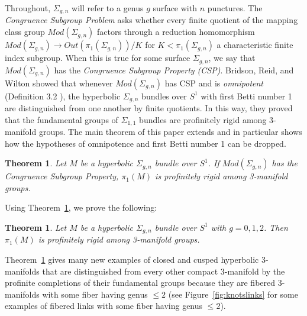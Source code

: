 \documentclass[12pt, reqno,oneside]{amsart}
\newtheorem{theorem}[lemma]{Theorem}
\theoremstyle{definition}
\theoremstyle{plain}
\theoremstyle{TheoremNum}
\numberwithin{equation}{section}
\numberwithin{table}{section}
\begin{document}
\medbreak Throughout, $\Sigma_{g,n}$ will refer to a genus $g$ surface with $n$ punctures. The {\it Congruence Subgroup Problem} asks whether every finite quotient of the mapping class group $Mod(\Sigma_{g,n})$ factors through a reduction homomorphism $Mod(\Sigma_{g,n})\to Out(\pi_1(\Sigma_{g,n}))/K$ for $K<\pi_1(\Sigma_{g,n})$ a characteristic finite index subgroup. When this is true for some surface $\Sigma_{g,n}$, we say that $Mod(\Sigma_{g,n})$ has the {\it Congruence Subgroup Property (CSP)}. Bridson, Reid, and Wilton \cite{BRW} showed that whenever $Mod(\Sigma_{g,n})$ has CSP and is {\it omnipotent} (Definition 3.2 \cite{omnipotence}), the hyperbolic $\Sigma_{g,n}$ bundles over $S^1$ with first Betti number 1 are distinguished from one another by finite quotients. In this way, they proved that the fundamental groups of $\Sigma_{1,1}$ bundles are profinitely rigid among 3-manifold groups. The main theorem of this paper extends \cite{BRW} and in particular shows how the hypotheses of omnipotence and first Betti number 1 can be dropped. 
\begin{theorem}\label{csp+omni}
Let $M$ be a hyperbolic $\Sigma_{g,n}$ bundle over $S^1$. If $Mod(\Sigma_{g,n})$ has the Congruence Subgroup Property, $\pi_1(M)$ is profinitely rigid among 3-manifold groups. 
\end{theorem}
Using Theorem~\ref{csp+omni}, we prove the following:
\begin{theorem}\label{profiniterig}
Let $M$ be a hyperbolic $\Sigma_{g,n}$ bundle over $S^1$ with $g=0,1,2$. Then $\pi_1(M)$ is profinitely rigid among 3-manifold groups. 
\end{theorem}
Theorem~\ref{profiniterig} gives many new examples of closed and cusped hyperbolic 3-manifolds that are distinguished from every other compact 3-manifold by the profinite completions of their fundamental groups because they are fibered 3-manifolds with some fiber having genus $\leq 2$ (see Figure~\ref{fig:knotslinks} for some examples of fibered links with some fiber having genus $\leq 2$). 
\end{document}
